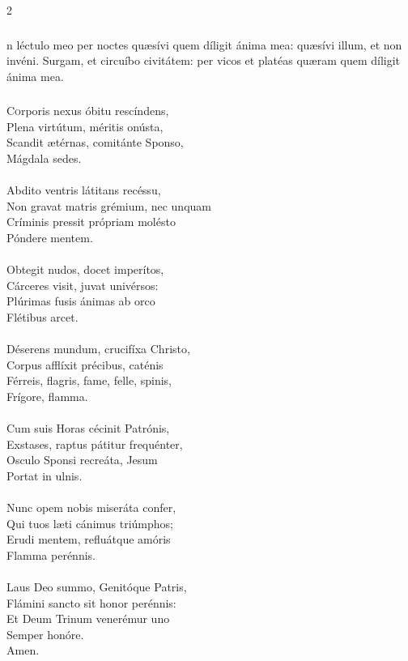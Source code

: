 \documentclass[9pt,twoside]{extarticle}
\begin{document}
\begin{multicols}{2}
\subsubsection*{}
n léctulo meo per noctes quæsívi quem díligit ánima mea: quæsívi illum, et non invéni. Surgam, et circuíbo civitátem: per vicos et platéas quæram quem díligit ánima mea.

\subsubsection*{\center {}}
\lettrine{C}orporis nexus óbitu rescíndens,\\
Plena virtútum, méritis onústa,\\
Scandit ætérnas, comitánte Sponso,\\
Mágdala sedes.\\
\\
Abdito ventris látitans recéssu,\\
Non gravat matris grémium, nec unquam\\
Críminis pressit própriam molésto\\
Póndere mentem.\\
\\
Obtegit nudos, docet imperítos,\\
Cárceres visit, juvat univérsos:\\
Plúrimas fusis ánimas ab orco\\
Flétibus arcet.\\
\\
Déserens mundum, crucifíxa Christo,\\
Corpus afflíxit précibus, caténis\\
Férreis, flagris, fame, felle, spinis,\\
Frígore, flamma.\\
\\
Cum suis Horas cécinit Patrónis,\\
Exstases, raptus pátitur frequénter,\\
Osculo Sponsi recreáta, Jesum\\
Portat in ulnis.\\
\\
Nunc opem nobis miseráta confer,\\
Qui tuos læti cánimus triúmphos;\\
Erudi mentem, refluátque amóris\\
Flamma perénnis.\\
\\
Laus Deo summo, Genitóque Patris,\\
Flámini sancto sit honor perénnis:\\
Et Deum Trinum venerémur uno\\
Semper honóre.\\
Amen.


\end{multicols}
\end{document}
